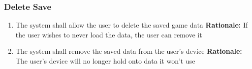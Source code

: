 \documentclass[12pt]{article}
\begin{document}
\subsubsection{Delete Save}
\begin{enumerate}[label=DS\arabic*., series=DeleteSave]
	\item The system shall allow the user to delete the saved game data \newline 
    \textbf{Rationale:} If the user wishes to never load the data, the user can remove it
    \item The system shall remove the saved data from the user's device \newline 
    \textbf{Rationale:} The user's device will no longer hold onto data it won't use
\end{enumerate}
\end{document}

